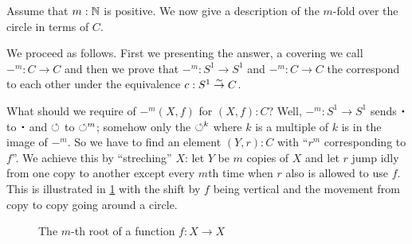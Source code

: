 \begin{example}\label{exa:mfoldCcover}
Assume that $m:\mathbb{N}$ is positive.  We now give a description of 
the $m$-fold \covering over the circle in terms of $C$.

We proceed as follows.  First we presenting the answer, a covering we call $-^m:C\to C$ and then we prove that $-^m:S^1\to S^1$ and $-^m:C\to C$ the  correspond to each other under the equivalence $c:S^1\overset\sim\to C$. 

 What should we require of $-^m(X,f)$ for $(X,f):C$? Well, $-^m:S^1\to S^1$ sends $\base$ to $\base$ and $\circlearrowleft$ to $\circlearrowleft^m$; somehow only the $\circlearrowleft^k$ where $k$ is a multiple of $k$ is in the image of $-^m$.  So we have to find an element $(Y,r):C$ with ``$r^m$ corresponding to $f$''.  We achieve this by ``streching'' $X$: let $Y$ be $m$ copies of $X$ and let $r$ jump idly from one copy to another except every $m$th time when $r$ also is allowed to use $f$.  
This is illustrated in \cref{fig:root} with the shift by $f$ being 
vertical and the movement from copy to copy going around a circle.  
\begin{figure}[bt]
  \centering
  \caption{The $m$-th root of a function $f: X\to X$}
  \label{fig:root}
\end{figure}


\end{example}
